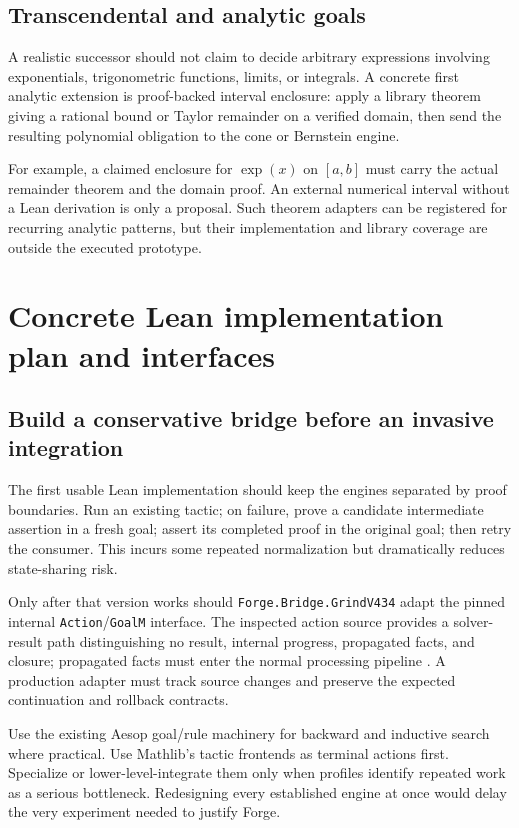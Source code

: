\documentclass[11pt,a4paper]{article}
\newcommand{\code}[1]{\texttt{#1}}
\begin{document}
\subsection{Transcendental and analytic goals}
A realistic successor should not claim to decide arbitrary expressions involving exponentials, trigonometric functions, limits, or integrals. A concrete first analytic extension is proof-backed interval enclosure: apply a library theorem giving a rational bound or Taylor remainder on a verified domain, then send the resulting polynomial obligation to the cone or Bernstein engine.

For example, a claimed enclosure for $\exp(x)$ on $[a,b]$ must carry the actual remainder theorem and the domain proof. An external numerical interval without a Lean derivation is only a proposal. Such theorem adapters can be registered for recurring analytic patterns, but their implementation and library coverage are outside the executed prototype.

\section{Concrete Lean implementation plan and interfaces}
\subsection{Build a conservative bridge before an invasive integration}
The first usable Lean implementation should keep the engines separated by proof boundaries. Run an existing tactic; on failure, prove a candidate intermediate assertion in a fresh goal; assert its completed proof in the original goal; then retry the consumer. This incurs some repeated normalization but dramatically reduces state-sharing risk.

Only after that version works should \code{Forge.Bridge.GrindV434} adapt the pinned internal \code{Action}/\code{GoalM} interface. The inspected action source provides a solver-result path distinguishing no result, internal progress, propagated facts, and closure; propagated facts must enter the normal processing pipeline \cite{grindaction}. A production adapter must track source changes and preserve the expected continuation and rollback contracts.

Use the existing Aesop goal/rule machinery for backward and inductive search where practical. Use Mathlib's tactic frontends as terminal actions first. Specialize or lower-level-integrate them only when profiles identify repeated work as a serious bottleneck. Redesigning every established engine at once would delay the very experiment needed to justify Forge.
\end{document}
